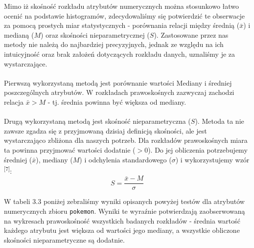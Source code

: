 \documentclass[12pt, a4paper]{report}
\begin{document}
Mimo iż skośność rozkładu atrybutów numerycznych można stosunkowo łatwo ocenić na podstawie histogramów, zdecydowaliśmy się potwierdzić te obserwacje za pomocą prostych miar statystycznych - porównania relacji między średnią (\(\bar x\)) i medianą (\(M\)) oraz skośności nieparametrycznej (\(S\)). Zastosowane przez nas metody nie należą do najbardziej precyzyjnych, jednak ze względu na ich intuicyjność oraz brak założeń dotyczących rozkładu danych, uznaliśmy je za wystarczające.\\\\
\noindent
Pierwszą wykorzystaną metodą jest porównanie wartości Mediany i średniej poszczególnych atrybutów. W rozkładach prawoskośnych zazwyczaj zachodzi relacja \(\bar x > M\) - tj. średnia powinna być większa od mediany.\\\\
\noindent
Drugą wykorzystaną metodą jest skośność nieparametryczna (\(S\)). Metoda ta nie zawsze zgadza się z przyjmowaną dzisiaj definicją skośności, ale jest wystarczająco zbliżona dla naszych potrzeb. Dla rozkładów prawoskośnych miara ta powinna przyjmować wartości dodatnie (\(>0\)). Do jej obliczenia potrzebujemy średniej (\(\bar x\)), mediany (\(M\)) i odchylenia standardowego (\(\sigma\)) i wykorzystujemy wzór \textsuperscript{[7]}:
\[S = \frac{\bar x - M}{\sigma}\]

\noindent
W tabeli 3.3 poniżej zebraliśmy wyniki opisanych powyżej testów dla atrybutów numerycznych zbioru \texttt{pokemon}. Wyniki te wyraźnie potwierdzają zaobserwowaną na wykresach prawoskośność wszystkich badanych rozkładów - średnia wartość każdego atrybutu jest większa od wartości jego mediany, a wszystkie obliczone skośności nieparametryczne są dodatnie.
\end{document}
